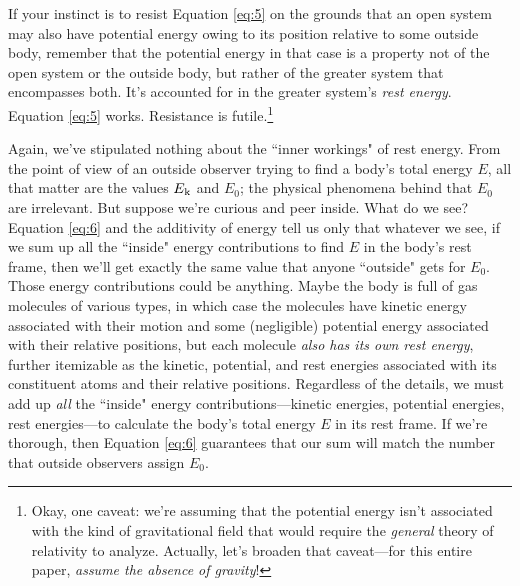 \documentclass[12pt]{article}
\begin{document}
If your instinct is to resist Equation \ref{eq:5} on the grounds that an open system may also have potential energy owing to its position relative to some outside body, remember that the potential energy in that case is a property not of the open system or the outside body, but rather of the greater system that encompasses both. It's accounted for in the greater system's \emph{rest energy}. Equation \ref{eq:5} works. Resistance is futile.\footnote{Okay, one caveat: we're assuming that the potential energy isn't associated with the kind of gravitational field that would require the \emph{general} theory of relativity to analyze. Actually, let's broaden that caveat---for this entire paper, \emph{assume the absence of gravity}!}

Again, we've stipulated nothing about the ``inner workings" of rest energy. From the point of view of an outside observer trying to find a body's total energy $E$, all that matter are the values $E_{\mkern.5mu \textrm{k}}$ and $E_0$; the physical phenomena behind that $E_0$ are irrelevant. But suppose we're curious and peer inside. What do we see? Equation \ref{eq:6} and the additivity of energy tell us only that whatever we see, if we sum up all the ``inside" energy contributions to find $E$ in the body's rest frame, then we'll get exactly the same value that anyone ``outside" gets for $E_0$. Those energy contributions could be anything. Maybe the body is full of gas molecules of various types, in which case the molecules have kinetic energy associated with their motion and some (negligible) potential energy associated with their relative positions, but each molecule \emph{also has its own rest energy}, further itemizable as the kinetic, potential, and rest energies associated with its constituent atoms and their relative positions. Regardless of the details, we must add up \emph{all} the ``inside" energy contributions---kinetic energies, potential energies, rest energies---to calculate the body's total energy $E$ in its rest frame. If we're thorough, then Equation \ref{eq:6} guarantees that our sum will match the number that outside observers assign $E_0$.
\end{document}
